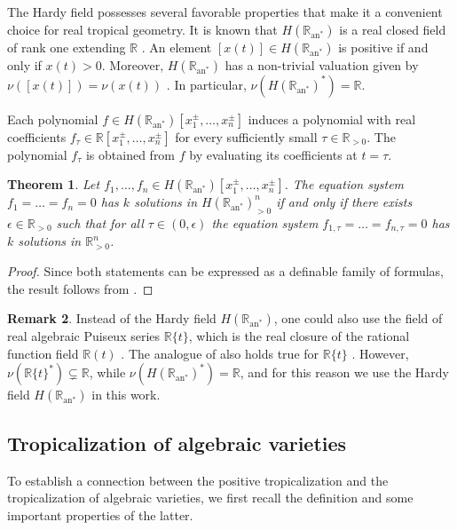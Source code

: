 \documentclass{article}
\newtheorem{theorem}{Theorem}[section]
\theoremstyle{definition}
\newtheorem{remark}[theorem]{Remark}
\begin{document}
The Hardy field possesses several favorable properties that make it a convenient choice for real tropical geometry.
It is known that $H( \mathbb{R}_{\text{an}^*})$ is a real closed field of rank one extending $\mathbb{R}$  \cite[Theorem 5.8]{Coste::oMinimal}. An element $[x(t)] \in H( \mathbb{R}_{\text{an}^*})$ is positive if and only if $x(t) > 0$. Moreover, $H( \mathbb{R}_{\text{an}^*})$ has a non-trivial valuation given by $\nu([x(t)]) = \nu(x(t))$ \cite[Section 4.1]{Alessandrini::LogLimit}. In particular, $\nu( H( \mathbb{R}_{\text{an}^*})^*) = \mathbb{R}$. 

Each polynomial $f \in H( \mathbb{R}_{\text{an}^*})[x_1^{\pm}, \dots , x_n^{\pm}]$ induces a polynomial with real coefficients $f_\tau \in \mathbb{R}[x_1^{\pm}, \dots , x_n^{\pm}]$ for every sufficiently small $\tau \in \mathbb{R}_{>0}$. The polynomial $f_\tau$ is obtained from $f$ by evaluating its coefficients at $t = \tau$.

\begin{theorem}
    \label{Thm::NumOfSols} Let $f_1,\dots, f_n \in H(\mathbb{R}_{\text{an}^*})[x_1^{\pm}, \dots , x_n^{\pm}]$. The equation system $f_1 = \dots = f_n = 0$ has $k$ solutions in $H(\mathbb{R}_{\text{an}^*})^n_{>0}$ if and only if there exists $\epsilon \in \mathbb{R}_{>0}$ such that for all $\tau \in (0,\epsilon)$ the equation system $f_{1,\tau} = \dots = f_{n,\tau} = 0$ has $k$ solutions in $\mathbb{R}^n_{>0}$. 
\end{theorem}

\begin{proof}
    Since both statements can be expressed as a definable family of formulas, the result follows from \cite[Proposition 5.9]{Coste::oMinimal}.
\end{proof}

\begin{remark}
    Instead of the Hardy field $H(\mathbb{R}_{\text{an}^*})$, one could also use the field of real algebraic Puiseux series $\mathbb{R}\{t\}$, which is the real closure of the rational function field $\mathbb{R}(t)$ \cite[Corollary 2.98]{basu2007algorithms}.
    The analogue of  also holds true for $\mathbb{R}\{t\}$ \cite[Propositon 3.17]{basu2007algorithms}.
    However, $\nu(\mathbb{R}\{t\}^*) \subsetneq \mathbb{R} $, while $\nu(H(\mathbb{R}_{\text{an}^*})^*) = \mathbb{R}$, and for this reason we use the Hardy field  $H(\mathbb{R}_{\text{an}^*})$ in this work.
\end{remark}

\subsection{Tropicalization of algebraic varieties}
\label{SubSec:TropAlg}
To establish a connection between the positive tropicalization and the tropicalization of algebraic varieties, we first recall the definition and some important properties of the latter.
\end{document}
